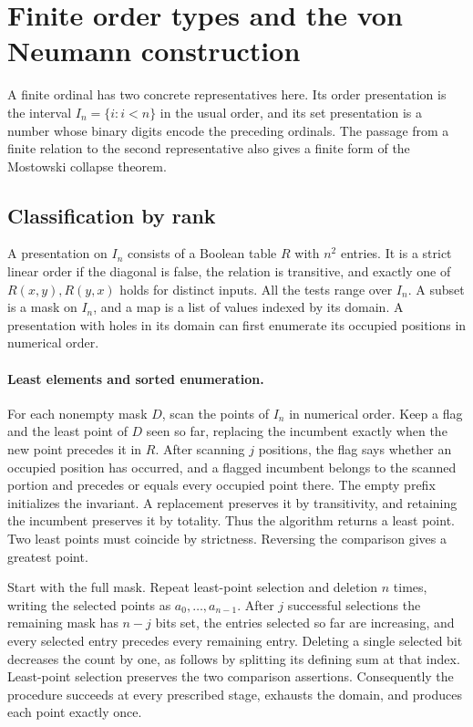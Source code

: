 \section{Finite order types and the von Neumann construction}
\label{sec:finite-models}

A finite ordinal has two concrete representatives here. Its order
presentation is the interval $I_n=\{i:i<n\}$ in the usual order, and its
set presentation is a number whose binary digits encode the preceding
ordinals. The passage from a finite relation to the second representative
also gives a finite form of the Mostowski collapse theorem.

\subsection{Classification by rank}

A presentation on $I_n$ consists of a Boolean table $R$ with $n^2$ entries.
It is a strict linear order if the diagonal is false, the relation is
transitive, and exactly one of $R(x,y),R(y,x)$ holds for distinct inputs.
All the tests range over $I_n$. A subset is a mask on $I_n$, and a map is
a list of values indexed by its domain. A presentation with holes in its
domain can first enumerate its occupied positions in numerical order.

\paragraph{Least elements and sorted enumeration.}
For each nonempty mask $D$, scan the points of $I_n$ in numerical order.
Keep a flag and the least point of $D$ seen so far, replacing the incumbent
exactly when the new point precedes it in $R$. After scanning $j$ positions,
the flag says whether an occupied position has occurred, and a flagged
incumbent belongs to the scanned portion and precedes or equals every
occupied point there. The empty prefix initializes the invariant. A
replacement preserves it by transitivity, and retaining the incumbent
preserves it by totality. Thus the algorithm returns a least point.
Two least points must coincide by strictness. Reversing the comparison
gives a greatest point.

Start with the full mask. Repeat least-point selection and deletion $n$
times, writing the selected points as $a_0,\ldots,a_{n-1}$. After $j$
successful selections the remaining mask has $n-j$ bits set, the entries
selected so far are increasing, and every selected entry precedes every
remaining entry. Deleting a single selected bit decreases the count by
one, as follows by splitting its defining sum at that index.
Least-point selection preserves the two comparison assertions. Consequently
the procedure succeeds at every prescribed stage, exhausts the domain,
and produces each point exactly once.

